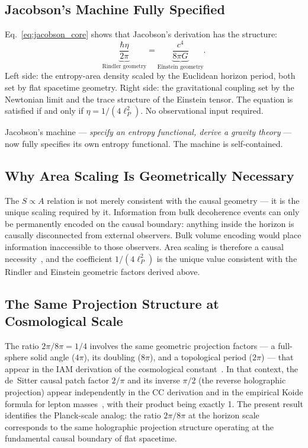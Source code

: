 \documentclass[12pt,a4paper]{article}
\begin{document}
\subsection{Jacobson's Machine Fully Specified}

Eq.~\eqref{eq:jacobson_core} shows that Jacobson's derivation has the
structure:
\begin{equation}
\underbrace{\frac{\hbar\eta}{2\pi}}_{\text{Rindler geometry}}
= \underbrace{\frac{c^4}{8\pi G}}_{\text{Einstein geometry}}.
\label{eq:structure}
\end{equation}
Left side: the entropy-area density scaled by the Euclidean horizon
period, both set by flat spacetime geometry. Right side: the
gravitational coupling set by the Newtonian limit and the trace
structure of the Einstein tensor. The equation is satisfied if and
only if $\eta = 1/(4\ell_P^2)$. No observational input required.

Jacobson's machine --- \textit{specify an entropy functional, derive
a gravity theory} --- now fully specifies its own entropy functional.
The machine is self-contained.

\subsection{Why Area Scaling Is Geometrically Necessary}

The $S \propto A$ relation is not merely consistent with the causal
geometry --- it is the unique scaling required by it. Information from
bulk decoherence events can only be permanently encoded on the causal
boundary: anything inside the horizon is causally disconnected from
external observers. Bulk volume encoding would place information
inaccessible to those observers. Area scaling is therefore a causal
necessity~\citep{tHooft1993,Susskind1995}, and the coefficient
$1/(4\ell_P^2)$ is the unique value consistent with the Rindler and
Einstein geometric factors derived above.

\subsection{The Same Projection Structure at Cosmological Scale}

The ratio $2\pi/8\pi = 1/4$ involves the same geometric projection
factors --- a full-sphere solid angle ($4\pi$), its doubling ($8\pi$),
and a topological period ($2\pi$) --- that appear in the IAM derivation
of the cosmological constant~\citep{IAM_archive}. In that context, the
de~Sitter causal patch factor $2/\pi$ and its inverse $\pi/2$ (the
reverse holographic projection) appear independently in the CC
derivation and in the empirical Koide formula for lepton
masses~\citep{IAM_archive,Koide1983}, with their product being exactly
1. The present result identifies the Planck-scale analog: the ratio
$2\pi/8\pi$ at the horizon scale corresponds to the same holographic
projection structure operating at the fundamental causal boundary of
flat spacetime.
\end{document}

